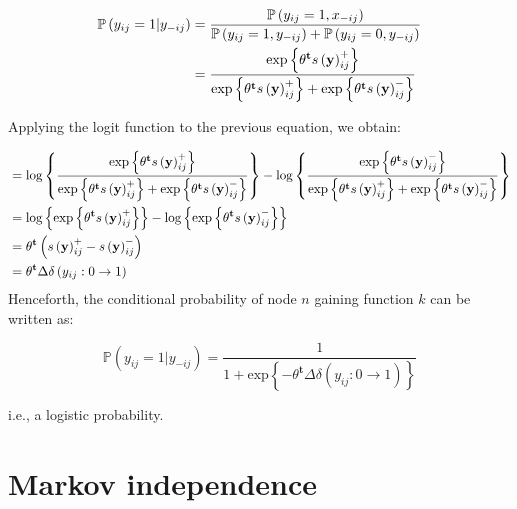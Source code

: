 \documentclass[]{book}
\begin{document}
\begin{align*}
    {\mathbb{P}\left(y_{ij} = 1|y_{-ij}\right) } & = %
        \frac{{\mathbb{P}\left(y_{ij} = 1, x_{-ij}\right) }}{%
            {\mathbb{P}\left(y_{ij} = 1, y_{-ij}\right) } + {\mathbb{P}\left(y_{ij} = 0, y_{-ij}\right) }} \\
        & = \frac{\mbox{exp}\left\{{\theta}^\mathbf{t}s\left(\mathbf{y}\right)^+_{ij}\right\}}{%
            \mbox{exp}\left\{{\theta}^\mathbf{t}s\left(\mathbf{y}\right)^+_{ij}\right\} + \mbox{exp}\left\{{\theta}^\mathbf{t}s\left(\mathbf{y}\right)^-_{ij}\right\}}
\end{align*}

Applying the logit function to the previous equation, we obtain:

\begin{align*}
& = \mbox{log}\left\{\frac{\mbox{exp}\left\{{\theta}^\mathbf{t}s\left(\mathbf{y}\right)^+_{ij}\right\}}{%
        \mbox{exp}\left\{{\theta}^\mathbf{t}s\left(\mathbf{y}\right)^+_{ij}\right\} + %
        \mbox{exp}\left\{{\theta}^\mathbf{t}s\left(\mathbf{y}\right)^-_{ij}\right\}}\right\} - %
    \mbox{log}\left\{ %
        \frac{\mbox{exp}\left\{{\theta}^\mathbf{t}s\left(\mathbf{y}\right)^-_{ij}\right\}}{%
            \mbox{exp}\left\{{\theta}^\mathbf{t}s\left(\mathbf{y}\right)^+_{ij}\right\} + \mbox{exp}\left\{{\theta}^\mathbf{t}s\left(\mathbf{y}\right)^-_{ij}\right\}}%
     \right\} \\
 & = \mbox{log}\left\{\mbox{exp}\left\{{\theta}^\mathbf{t}s\left(\mathbf{y}\right)^+_{ij}\right\}\right\} - \mbox{log}\left\{\mbox{exp}\left\{{\theta}^\mathbf{t}s\left(\mathbf{y}\right)^-_{ij}\right\}\right\} \\
 & = {\theta}^\mathbf{t}\left(s\left(\mathbf{y}\right)^+_{ij} - s\left(\mathbf{y}\right)^-_{ij}\right) \\
 & = {\theta}^\mathbf{t}\Delta\delta\left(y_{ij}:0\to 1\right)
\end{align*}
\noindent Henceforth, the conditional probability of node \(n\) gaining function \(k\) can be written as:

\begin{equation}
    {\mathbb{P}\left(y_{ij} = 1|y_{-ij}\right) } = \frac{1}{1 + \mbox{exp}\left\{-{\theta}^\mathbf{t}\Delta\delta\left(y_{ij}:0\to 1\right)\right\}}
\end{equation}

\noindent i.e., a logistic probability.

\hypertarget{markov-independence}{%
\section{Markov independence}\label{markov-independence}}
\end{document}
